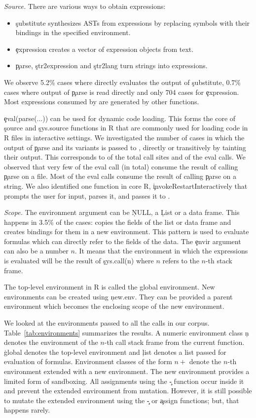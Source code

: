 \documentclass[acmsmall]{acmart}
\newcommand{\mypara}[1]{\medskip\noindent\emph{#1}\xspace}
\begin{document}
\mypara{Source.}
There are various ways to obtain expressions:
\begin{itemize}
  \item \c{substitute} synthesizes ASTs from expressions by replacing
    symbols with their bindings in the specified environment.
  \item \c{expression}  creates a vector of expression
    objects from text.
  \item \c{parse}, \c{str2expression} and \c{str2lang} turn strings into
    expressions.
\end{itemize}

We observe 5.2\% cases where \eval directly evaluates the output of
\c{substitute}, 0.7\% cases where output of \c{parse} is read directly
and only 704 cases for \c{expression}. Most expressions consumed by
\eval are generated by other functions.

\c{eval(parse(...))} can be used for dynamic code loading. This forms
the core of \c{source} and \c{sys.source} functions in R that are
commonly used for loading code in R files in interactive settings. We
investigated the number of cases in which the output of \c{parse} and
its variants is passed to \eval, directly or transitively by tainting
their output. This corresponds to \PercentParsedCallSites of the total
\eval call sites and \PercentParsedEvals of the eval calls. We
observed that very few of the eval call (\NbParseFilesRnd in total)
consume the result of calling \c{parse} on a file. Most of the eval
calls consume the result of calling \c{parse} on a string. We also
identified one function in core R, \c{invokeRestartInteractively} that
prompts the user for input, parses it, and passes it to \eval.


\mypara{Scope.} The environment argument can be \c{NULL}, a \c{List}
or a data frame. This happens in 3.5\% of the cases: \eval copies the
fields of the list or data frame and creates bindings for them in a
new environment. This pattern is used to evaluate formulas which can
directly refer to the fields of the data. The \c{envir} argument can
also be a number $n$. It means that the environment in which the
expressions is evaluated will be the result of \c{sys.call(n)} where
$n$ refers to the $n$-th stack frame.

The top-level environment in R is called the global environment. New
environments can be created using \c{new.env}. They can be provided a
parent environment which becomes the enclosing scope of the new
environment.

We looked at the environments passed to all the \eval calls in our
corpus. Table~\ref{tab:environments} summarizes the results. A numeric
environment class \c{n} denotes the environment of the $n$-th call
stack frame from the current function. \c{global} denotes the
top-level environment and \c{list} denotes a list passed for
evaluation of formulas. Environment classes of the form $n+$ denote
the $n$-th environment extended with a new environment. The new
environment provides a limited form of sandboxing. All assignments
using the \c{\<-} function occur inside it and prevent the extended
environment from mutation. However, it is still possible to mutate the
extended environment using the \c{\<\<-} or \c{assign} functions; but,
that happens rarely.
\end{document}
